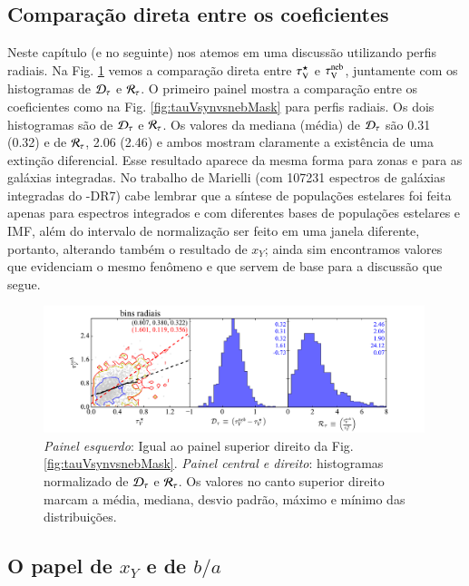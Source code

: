 \subsection{Comparação direta entre os coeficientes}
\label{sec:difextin:emp:comparetauV}

Neste capítulo (e no seguinte) nos atemos em uma discussão utilizando perfis radiais. Na Fig.
\ref{fig:tauVhisto} vemos a comparação direta entre $\tauVS$ e $\tau_{\mathrm{V}}^{\mathrm{neb}}$, juntamente com os
histogramas de $\Dtau$ e $\Rtau$. O primeiro painel mostra a comparação entre os coeficientes como
na Fig. \ref{fig:tauVsynvsnebMask} para perfis radiais. Os dois histogramas são de $\Dtau$ e
$\Rtau$. Os valores da mediana (média) de $\Dtau$ são 0.31 (0.32) e de $\Rtau$, 2.06 (2.46) e ambos
mostram claramente a existência de uma extinção diferencial. Esse resultado aparece da mesma forma
para zonas e para as galáxias integradas. No trabalho de Marielli (com 107231 espectros de galáxias
integradas do \SDSS-DR7) cabe lembrar que a síntese de populações estelares foi feita apenas para
espectros integrados e com diferentes bases de populações estelares e IMF, além do intervalo de
normalização ser feito em uma janela diferente, portanto, alterando também o resultado de $x_Y$;
ainda sim encontramos valores que evidenciam o mesmo fenômeno e que servem de base para a discussão
que segue.

\begin{figure}
	\centering
	\includegraphics[width=0.99\textwidth]{figuras/histoTauVR.pdf}
	\caption[Comparação $\tauVS$ e histogramas de $\Dtau$ e $\Rtau$.]
	{\emph{Painel esquerdo}: Igual ao painel superior direito da Fig. \ref{fig:tauVsynvsnebMask}.
\emph{Painel central e direito}: histogramas normalizado de $\Dtau$ e $\Rtau$. Os valores no canto
superior direito marcam a média, mediana, desvio padrão, máximo e mínimo das distribuições.}
	\label{fig:tauVhisto}
\end{figure}

\subsection{O papel de $x_Y$ e de $b/a$}
\label{sec:difextin:emp:xYcosi}

